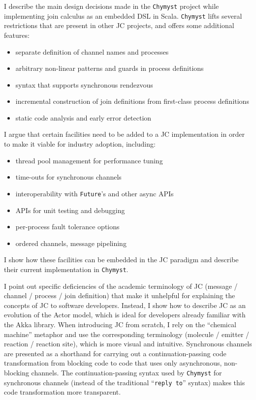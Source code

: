 \documentclass[sigplan,10pt,review,anonymous]{acmart}\settopmatter{printfolios=true}
\begin{document}
I describe the main design decisions made in the \texttt{Chymyst}
project while implementing join calculus as an embedded DSL in Scala. 
\texttt{Chymyst} lifts several restrictions that are present in other
JC projects, and offers some additional features:
\begin{itemize}
\item separate definition of channel names and processes
\item arbitrary non-linear patterns and guards in process definitions
\item syntax that supports synchronous rendezvous
\item incremental construction of join definitions from first-class process
definitions
\item static code analysis and early error detection
\end{itemize}
I argue that certain facilities need to be added to a JC implementation
in order to make it viable for industry adoption, including:
\begin{itemize}
\item thread pool management for performance tuning
\item time-outs for synchronous channels
\item interoperability with \texttt{Future}'s and other async APIs
\item APIs for unit testing and debugging
\item per-process fault tolerance options
\item ordered channels, message pipelining
\end{itemize}
I show how these facilities can be embedded in the JC paradigm
and describe their current implementation in \texttt{Chymyst}.

I point out specific deficiencies of the academic terminology of JC
(message / channel / process / join definition) that make it unhelpful
for explaining the concepts of JC to software developers. Instead,
I show how to describe JC as an evolution of the Actor model, which
is ideal for developers already familiar with the Akka library. When
introducing JC from scratch, I rely on the ``chemical machine''
metaphor and use the corresponding terminology (molecule / emitter
/ reaction / reaction site), which is more visual and intuitive. Synchronous
channels are presented as a shorthand for carrying out a continuation-passing
code transformation from blocking code to code that uses only asynchronous,
non-blocking channels. The continuation-passing syntax used by \texttt{Chymyst}
for synchronous channels (instead of the traditional ``\texttt{reply
to}'' syntax) makes this code transformation more transparent.
\end{document}
